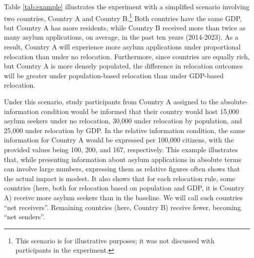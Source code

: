 \documentclass[
  12pt,
  a4paper,
]{article}
\begin{document}
Table \ref{tab:example} illustrates the experiment with a simplified scenario involving two countries, Country A and Country B.\footnote{
  This scenario is for illustrative purposes; it was not discussed with participants in the experiment.} Both countries have the same GDP, but Country A has more residents, while Country B received more than twice as many asylum applications, on average, in the past ten years (2014-2023). As a result, Country A will experience more asylum applications under proportional relocation than under no relocation. Furthermore, since countries are equally rich, but Country A is more densely populated, the difference in relocation outcomes will be greater under population-based relocation than under GDP-based relocation.

Under this scenario, study participants from Country A assigned to the absolute-information condition would be informed that their country would host 15,000 asylum seekers under no relocation, 30,000 under relocation by population, and 25,000 under relocation by GDP. In the relative information condition, the same information for Country A would be expressed per 100,000 citizens, with the provided values being 100, 200, and 167, respectively. This example illustrates that, while presenting information about asylum applications in absolute terms can involve large numbers, expressing them as relative figures often shows that the actual impact is modest. It also shows that for each relocation rule, some countries (here, both for relocation based on population and GDP, it is Country A) receive more asylum seekers than in the baseline. We will call such countries ``net receivers''. Remaining countries (here, Country B) receive fewer, becoming ``net senders''.
\end{document}
